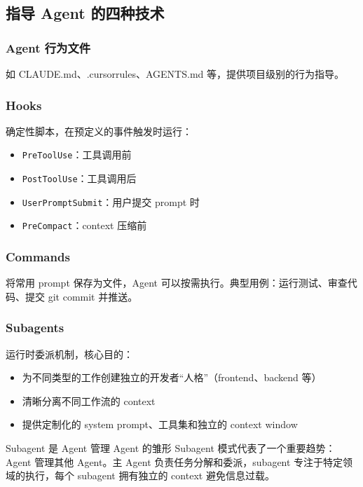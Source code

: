 \subsection{指导 Agent 的四种技术}

\subsubsection{Agent 行为文件}

如 CLAUDE.md、.cursorrules、AGENTS.md 等，提供项目级别的行为指导。

\subsubsection{Hooks}

确定性脚本，在预定义的事件触发时运行：
\begin{itemize}
    \item \texttt{PreToolUse}：工具调用前
    \item \texttt{PostToolUse}：工具调用后
    \item \texttt{UserPromptSubmit}：用户提交 prompt 时
    \item \texttt{PreCompact}：context 压缩前
\end{itemize}

\subsubsection{Commands}

将常用 prompt 保存为文件，Agent 可以按需执行。典型用例：运行测试、审查代码、提交 git commit 并推送。

\subsubsection{Subagents}

运行时委派机制，核心目的：
\begin{itemize}
    \item 为不同类型的工作创建独立的开发者``人格''（frontend、backend 等）
    \item 清晰分离不同工作流的 context
    \item 提供定制化的 system prompt、工具集和独立的 context window
\end{itemize}

\begin{importantbox}{Subagent 是 Agent 管理 Agent 的雏形}
Subagent 模式代表了一个重要趋势：Agent 管理其他 Agent。主 Agent 负责任务分解和委派，subagent 专注于特定领域的执行，每个 subagent 拥有独立的 context 避免信息过载。
\end{importantbox}

